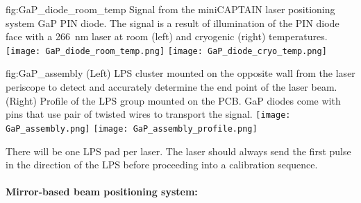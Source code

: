 

\begin{dunefigure}{fig:GaP_diode_room_temp}
{Signal from the miniCAPTAIN laser positioning system GaP PIN diode. The signal is a result of illumination of the PIN diode face with a \SI{266}{\nano\m} laser at room (left) and cryogenic (right) temperatures.}
\texttt{[image: GaP\_diode\_room\_temp.png]} 
\texttt{[image: GaP\_diode\_cryo\_temp.png]} 
\end{dunefigure}



\begin{dunefigure}{fig:GaP_assembly}
{(Left) LPS cluster mounted on the opposite wall from the laser periscope to detect and accurately determine the end point of the laser beam. (Right)
Profile of the LPS group mounted on the PCB. GaP diodes come with pins that use pair of twisted wires to transport the signal.
}
\texttt{[image: GaP\_assembly.png]} 
\texttt{[image: GaP\_assembly\_profile.png]} 
\end{dunefigure}


There will be one LPS pad per laser. The laser should always send the first pulse in the direction of the LPS before proceeding into a calibration sequence. 


\paragraph{Mirror-based beam positioning system:}


